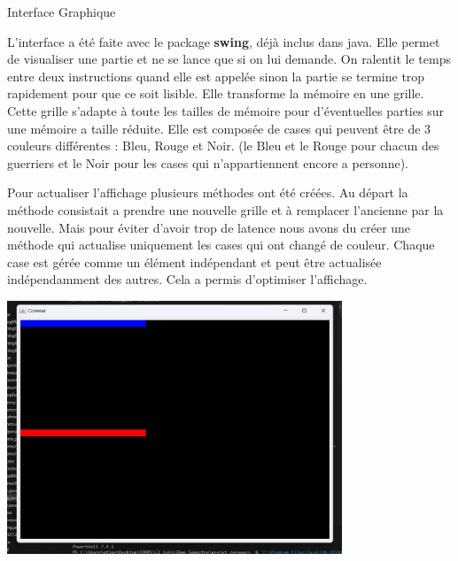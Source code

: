 \documentclass[a4paper, 10pt]{article}
\begin{document}
    \begin{section}{Interface Graphique}
        \par
            L'interface a été faite avec le package \textbf{swing}, déjà inclus dans java. Elle permet de visualiser une partie et ne se lance que si on lui demande. On ralentit le temps entre deux instructions quand elle est appelée sinon la partie se termine trop rapidement pour que ce soit lisible. Elle transforme la mémoire en une grille. Cette grille s'adapte à toute les tailles de mémoire pour d'éventuelles parties sur une mémoire a taille réduite. Elle est composée de cases qui peuvent être de 3 couleurs différentes : Bleu, Rouge et Noir. (le Bleu et le Rouge pour chacun des guerriers et le Noir pour les cases qui n'appartiennent encore a personne).
            \bigskip

        \par
            Pour actualiser l'affichage plusieurs méthodes ont été créées. Au départ la méthode consistait a prendre une nouvelle grille et à remplacer l'ancienne par la nouvelle. Mais pour éviter d'avoir trop de latence nous avons du créer une méthode qui actualise uniquement les cases qui ont changé de couleur. Chaque case est gérée comme un élément indépendant et peut être actualisée indépendamment des autres. Cela a permis d'optimiser l'affichage. 

            \bigskip
            \includegraphics[width=10cm]{img/display.jpg}
            \centering

        \bigskip
    \end{section}
\end{document}
